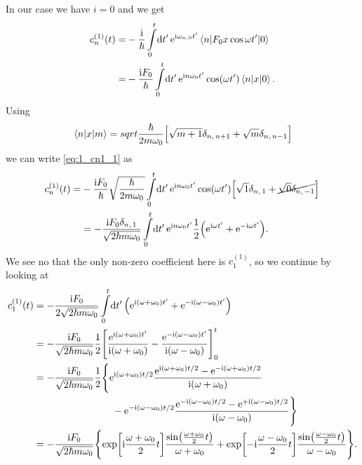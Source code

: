 \documentclass[11pt,letter, swedish, english
]{article}
\begin{document}
In our case we have $i=0$ and we get
\begin{equation}\label{eq:1_cn1_1}
\begin{aligned}
c_n^{(1)}(t)=&-\frac{\ii}{\hbar}
\int_0^t\!\rd{t'} \,\ee^{\ii\omega_{n,0}t'}
\mel{n}{F_0x\cos\omega t'}{0}\\
=&-\frac{\ii F_0}{\hbar}
\int_0^t\!\rd{t'} \,\ee^{\ii n\omega_{0}t'}
\cos(\omega t')\mel{n}{x}{0}.
\end{aligned}
\end{equation}
Using
\begin{equation}\label{eq:1_mel_x}
\mel{n}{x}{m}=sqrt{\frac{\hbar}{2m\omega_0}}
\Big[ \sqrt{m+1}\delta_{n,\,n+1}+\sqrt{m}\delta_{n,\,n-1}
\Big]
\end{equation}
we can write \eqref{eq:1_cn1_1} as
\begin{equation}\label{eq:1_cn1_2}
\begin{aligned}
c_n^{(1)}(t)=&-\frac{\ii F_0}{\hbar}\sqrt{\frac{\hbar}{2m\omega_0}}
\int_0^t\!\rd{t'} \,\ee^{\ii n\omega_{0}t'}
\cos(\omega t')\Big[ 
\sqrt{1}\delta_{n,\,1}+\cancel{\sqrt{0}\delta_{n,\,-1}}\Big]\\
&=-\frac{\ii F_0 \delta_{n,\,1}}{\sqrt{2\hbar m\omega_0}}
\int_0^t\!\rd{t'} \,\ee^{\ii n\omega_{0}t'}
\frac{1}{2}\qty(\ee^{\ii \omega t'}+\ee^{-\ii \omega t'}).
\end{aligned}
\end{equation}
We see no that the only non-zero coefficient here is $c_1^{(1)}$, so
we continue by looking at
\begin{equation}\label{eq:1_cn1_3}
\begin{aligned}
c_1^{(1)}(t)&=-\frac{\ii F_0 }{2\sqrt{2\hbar m\omega_0}}
\int_0^t\!\rd{t'} \,
\qty(\ee^{\ii(\omega+\omega_0)t'}+\ee^{-\ii(\omega-\omega_0)t'})\\
&=-\frac{\ii F_0}{\sqrt{2\hbar m\omega_0}}\frac{1}{2}
\qty[\frac{\ee^{\ii(\omega+\omega_0)t'}}{\ii(\omega+\omega_0)}
-\frac{\ee^{-\ii(\omega-\omega_0)t'}}{\ii(\omega-\omega_0)}]_0^t\\
&=-\frac{\ii F_0}{\sqrt{2\hbar m\omega_0}}\frac{1}{2}
\Bigg\{\ee^{\ii(\omega+\omega_0)t/2}\frac{\ee^{\ii(\omega+\omega_0)t/2}
-\ee^{-\ii(\omega+\omega_0)t/2}}{\ii(\omega+\omega_0)}
\\ & \hspace{80pt}
-\ee^{-\ii(\omega-\omega_0)t/2}\frac{\ee^{-\ii(\omega-\omega_0)t/2}
-\ee^{+\ii(\omega-\omega_0)t/2}}{\ii(\omega-\omega_0)}
\Bigg\}\\
&=-\frac{\ii F_0}{\sqrt{2\hbar m\omega_0}}
\qty{
\exp[\ii\frac{\omega+\omega_0}{2}t]\frac{\sin(\frac{\omega+\omega_0}{2}t)}
{\omega+\omega_0}
+\exp[-\ii\frac{\omega-\omega_0}{2}t]\frac{\sin(\frac{\omega-\omega_0}{2}t)}
{\omega-\omega_0}
}.
\end{aligned}
\end{equation}
\end{document}
